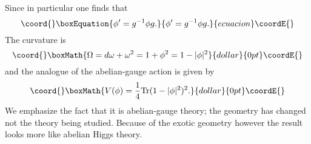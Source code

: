 \documentclass[a4paper,12pt]{article}
\def\tr{\mbox{Tr}}
\begin{document}
Since in particular \myHighlight{$ \eta^\prime = \eta$}\coordHE{} one finds that
\begin{equation}\coord{}\boxEquation{
\phi^\prime = g^{-1} \phi g.                           \label{sec:3}
}{
\phi^\prime = g^{-1} \phi g.                           }{ecuacion}\coordE{}\end{equation}
The curvature is 
$$\coord{}\boxMath{
\Omega = d\omega + \omega^2 = 1 + \phi^2  = 1 - \vert \phi \vert^2
}{dollar}{0pt}\coordE{}$$
and the analogue of the abelian-gauge action is given by
$$\coord{}\boxMath{
V(\phi) = \frac 14 \tr (1 - \vert \phi \vert^2)^2.
}{dollar}{0pt}\coordE{}$$
We emphasize the fact that it is abelian-gauge theory; the geometry has
changed not the theory being studied. Because of the exotic geometry
however the result looks more like abelian Higgs theory.
\end{document}
